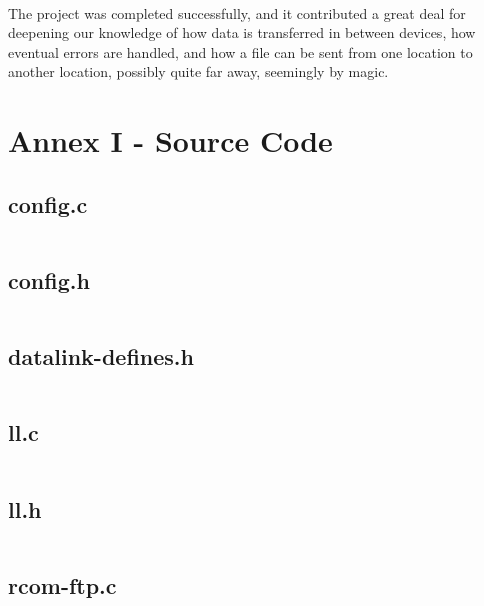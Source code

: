 \documentclass[11pt]{article}
\begin{document}
\paragraph{}The project was completed successfully, and it contributed a great deal for deepening our knowledge of how data is transferred in between devices, how eventual errors are handled, and how a file can be sent from one location to another location, possibly quite far away, seemingly by magic.

\newpage

\section*{Annex I - Source Code}

\subsection*{config.c}

\inputminted{c}{config.c}

\newpage

\subsection*{config.h}

\inputminted{c}{config.h}

\newpage

\subsection*{datalink-defines.h}

\inputminted{c}{datalink-defines.h}

\newpage

\subsection*{ll.c}

\inputminted{c}{ll.c}

\newpage

\subsection*{ll.h}

\inputminted{c}{ll.h}

\newpage

\subsection*{rcom-ftp.c}
\end{document}
